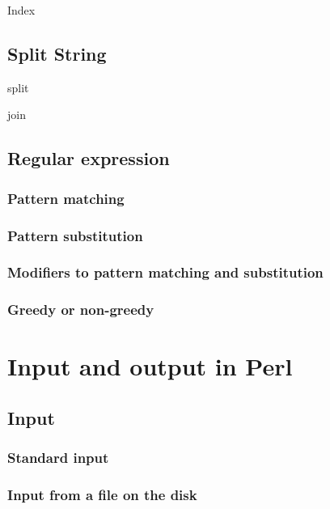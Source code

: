 \documentclass[]{book}
\theoremstyle{definition}
\theoremstyle{definition}
\theoremstyle{definition}
\theoremstyle{remark}
\begin{document}
Index

\section{Split String}\label{split-string}

split

join

\section{Regular expression}\label{regular-expression}

\subsection{Pattern matching}\label{pattern-matching}

\subsection{Pattern substitution}\label{pattern-substitution}

\subsection{Modifiers to pattern matching and
substitution}\label{modifiers-to-pattern-matching-and-substitution}

\subsection{Greedy or non-greedy}\label{greedy-or-non-greedy}

\chapter{Input and output in Perl}\label{input-and-output-in-perl}

\section{Input}\label{input}

\subsection{Standard input}\label{standard-input}

\subsection{Input from a file on the
disk}\label{input-from-a-file-on-the-disk}
\end{document}
